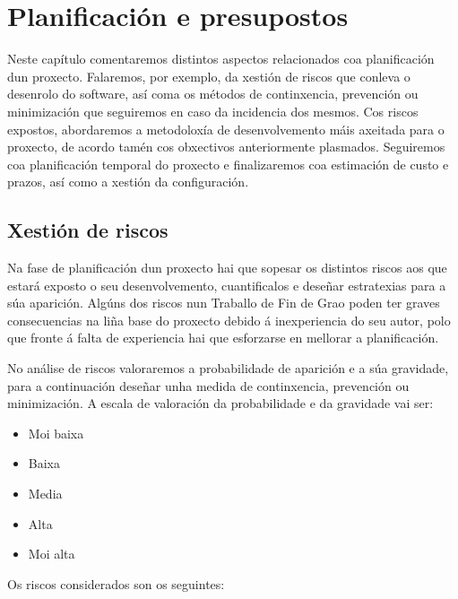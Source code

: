 \chapter{Planificación e presupostos}

Neste capítulo comentaremos distintos aspectos relacionados coa planificación dun proxecto. Falaremos, por exemplo, da xestión de riscos que conleva o desenrolo do software, así coma os métodos de continxencia, prevención ou minimización que seguiremos en caso da incidencia dos mesmos. Cos riscos expostos, abordaremos a metodoloxía de desenvolvemento máis axeitada para o proxecto, de acordo tamén cos obxectivos anteriormente plasmados. Seguiremos coa planificación temporal do proxecto e finalizaremos coa estimación de custo e prazos, así como a xestión da configuración. 

\section{Xestión de riscos}

Na fase de planificación dun proxecto hai que sopesar os distintos riscos aos que estará exposto o seu desenvolvemento, cuantificalos e deseñar estratexias para a súa aparición. Algúns dos riscos nun Traballo de Fin de Grao poden ter graves consecuencias na liña base do proxecto debido á inexperiencia do seu autor, polo que fronte á falta de experiencia hai que esforzarse en mellorar a planificación.

No análise de riscos valoraremos a probabilidade de aparición e a súa gravidade, para a continuación deseñar unha medida de continxencia, prevención ou minimización. A escala de valoración da probabilidade e da gravidade vai ser:

\begin{itemize}
\item Moi baixa
\item Baixa
\item Media
\item Alta
\item Moi alta
\end{itemize} 

Os riscos considerados son os seguintes:

